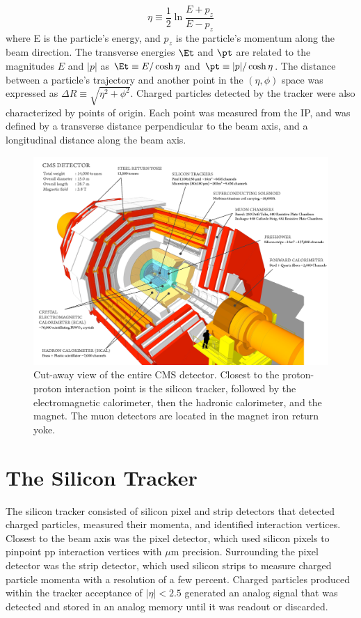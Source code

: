 \begin{equation}
	\eta \equiv \frac{1}{2}\ln{\frac{E+p_{z}}{E-p_{z}}}
\end{equation}
where E is the particle's energy, and $p_{z}$ is the particle's momentum along the beam direction.  The 
transverse energies $\Et$ and $\pt$ are related to the magnitudes $E$ and $|p|$ as $\Et \equiv E/\cosh{\eta}$ and 
$\pt \equiv |p|/\cosh{\eta}$.  The distance between a particle's trajectory and another point in the $(\eta,\phi)$ 
space was expressed as $\Delta R \equiv \sqrt{\eta^{2} + \phi^{2}}$.  Charged particles detected by the tracker 
were also characterized by points of origin.  Each point was measured from the IP, and was defined by a transverse 
distance perpendicular to the beam axis, and a longitudinal distance along the beam axis.

\begin{figure}[h]
	\centering
	\includegraphics[width=1\textwidth]{figures/cmsDetectorBasic.png}
	\caption{Cut-away view of the entire CMS detector.  Closest to the proton-proton interaction point is the 
		silicon tracker, followed by the electromagnetic calorimeter, then the hadronic calorimeter, and the 
	magnet.  The muon detectors are located in the magnet iron return yoke.}
	\label{fig:layersOfCMS}
\end{figure}

\section{The Silicon Tracker}
\label{sec:siTrackerDescription}
The silicon tracker consisted of silicon pixel and strip detectors that detected charged particles, measured their 
momenta, and identified interaction vertices.  Closest to the beam axis was the pixel detector, which used silicon 
pixels to pinpoint pp interaction vertices with $\mu$m precision.  
Surrounding the pixel detector was the strip detector, which used silicon strips to measure charged particle momenta with 
a resolution of a few percent.  Charged particles produced within the tracker acceptance of $|\eta| < 2.5$ generated an 
analog signal that was detected and stored in an analog memory until it was readout or discarded.

